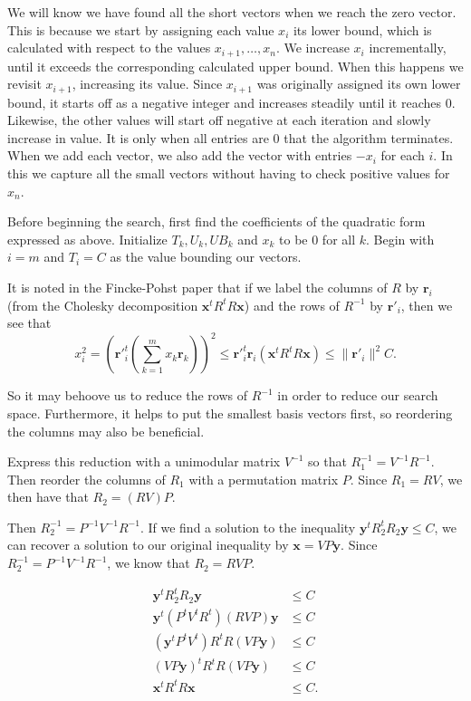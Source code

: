 We will know we have found all the short vectors when we reach the zero vector. This is because we start by assigning each value $x_i$ its lower bound, which is calculated with respect to the values $x_{i+1}, \dots, x_n$. We increase $x_i$ incrementally, until it exceeds the corresponding calculated upper bound. When this happens we revisit $x_{i+1}$, increasing its value. Since $x_{i+1}$ was originally assigned its own lower bound, it starts off as a negative integer and increases steadily until it reaches $0$. Likewise, the other values will start off negative at each iteration and slowly increase in value. It is only when all entries are $0$ that the algorithm terminates. When we add each vector, we also add the vector with entries $-x_i$ for each $i$. In this we capture all the small vectors without having to check positive values for $x_n$.

Before beginning the search, first find the coefficients of the quadratic form expressed as above. Initialize $T_k,U_k,UB_k$ and $x_k$ to be $0$ for all $k$. Begin with $i = m$ and $T_i = C$ as the value bounding our vectors.

It is noted in the Fincke-Pohst paper that if we label the columns of $R$ by $\mathbf{r}_i$ (from the Cholesky decomposition $\mathbf{x}^tR^tR\mathbf{x}$) and the rows of $R^{-1}$ by $\mathbf{r}'_i$, then we see that 
\[x_i^2 = \left( \mathbf{r}'^t_i \left( \sum_{k=1}^m x_k \mathbf{r}_k\right) \right)^2 \leq \mathbf{r}'^t_i \mathbf{r}_i (\mathbf{x}^tR^tR\mathbf{x}) \leq \| \mathbf{r}'_i \|^2C.\]

So it may behoove us to reduce the rows of $R^{-1}$ in order to reduce our search space. Furthermore, it helps to put the smallest basis vectors first, so reordering the columns may also be beneficial.

Express this reduction with a unimodular matrix $V^{-1}$ so that $R_1^{-1} = V^{-1}R^{-1}$. Then reorder the columns of $R_1$ with a permutation matrix $P$. Since $R_1 = RV$, we then have that $R_2 = (RV)P$.

Then $R_2^{-1} = P^{-1}V^{-1}R^{-1}$. If we find a solution to the inequality $\mathbf{y}^tR_2^tR_2\mathbf{y}\leq C$, we can recover a solution to our original inequality by $\mathbf{x} = VP\mathbf{y}$. Since $R^{-1}_2 =P^{-1}V^{-1}R^{-1}$, we know that $R_2 = RVP$. 

\begin{align*}
\mathbf{y}^tR_2^tR_2\mathbf{y} & \leq C\\
\mathbf{y}^t(P^tV^tR^t)(RVP)\mathbf{y} & \leq C\\
(\mathbf{y}^tP^tV^t)R^tR(VP\mathbf{y}) & \leq C\\
(VP\mathbf{y})^tR^tR(VP\mathbf{y}) & \leq C\\
\mathbf{x}^tR^tR\mathbf{x} &\leq C.
\end{align*}


